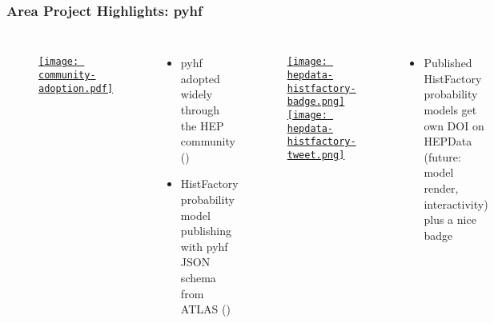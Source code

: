\begin{frame}
  \frametitle{Area Project Highlights: pyhf}


  \begin{columns}
    \begin{figure}
        \begin{center}
            \href{https://scikit-hep.org/pyhf/citations.html}{\texttt{[image: community-adoption.pdf]}}
        \end{center}
    \end{figure}
    \begin{itemize}
      \item pyhf adopted widely through the HEP community ()
      \item HistFactory probability model publishing with pyhf JSON schema from ATLAS ()
    \end{itemize}
%
    \begin{figure}
        \begin{center}
            \href{https://www.hepdata.net/search/?q=analysis:HistFactory}{\texttt{[image: hepdata-histfactory-badge.png]}}
            \href{https://twitter.com/HEPData/status/1529038702344798212}{\texttt{[image: hepdata-histfactory-tweet.png]}}
        \end{center}
    \end{figure}
    \vspace{-10pt}
    \begin{itemize}
      \item Published HistFactory probability models get own DOI on HEPData (future: model render, interactivity) plus a nice badge
    \end{itemize}
  \end{columns}

\end{frame}

